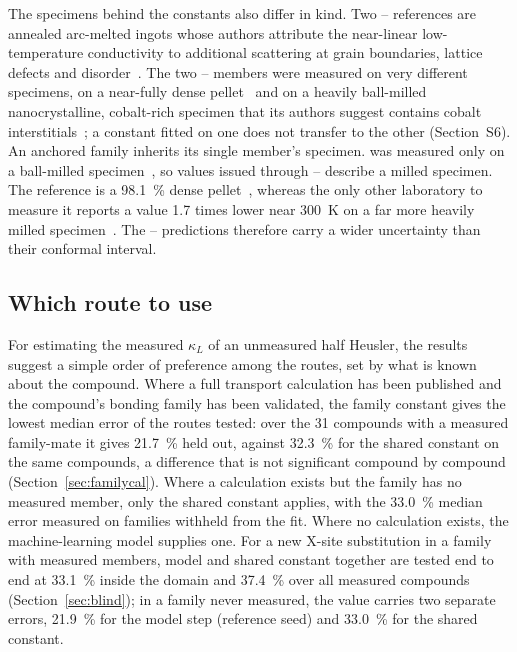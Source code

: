 The specimens behind the constants also differ in kind. Two -- references
are annealed arc-melted ingots whose authors attribute the near-linear low-temperature
conductivity to additional scattering at grain boundaries, lattice defects and
disorder~\cite{mukhopadhyay2018multifunct}. The two -- members were measured on very
different specimens,  on a near-fully dense pellet~\cite{thiem2025thermoelec} and
 on a heavily ball-milled nanocrystalline, cobalt-rich specimen that its authors
suggest contains cobalt interstitials~\cite{li2019ntype}; a constant fitted on one does not
transfer to the other (Section~S6). An anchored family inherits its single member's specimen.
 was measured only on a ball-milled specimen~\cite{mao2017thermoelec}, so values issued
through -- describe a milled specimen. The  reference is a
\SI{98.1}{\percent} dense pellet~\cite{zhao2018synthesis}, whereas the only other laboratory to
measure it reports a value \num{1.7} times lower near \SI{300}{\kelvin} on a far more heavily
milled specimen~\cite{zhu2018discovery}. The -- predictions therefore carry a wider
uncertainty than their conformal interval.

\subsection{Which route to use}
\label{sec:routes}

For estimating the measured $\kappa_L$ of an unmeasured half Heusler, the results suggest a simple
order of preference among the routes, set by what is known about the compound. Where a
full transport calculation has been published and the compound's bonding family has been
validated, the family constant gives the lowest median error of the routes tested: over the
\num{31} compounds with a measured family-mate it gives \SI{21.7}{\percent} held out, against
\SI{32.3}{\percent} for the shared constant on the same compounds, a difference that is not
significant compound by compound (Section~\ref{sec:familycal}). Where a calculation exists but
the family has no measured member, only the shared constant applies, with the \SI{33.0}{\percent}
median error measured on families withheld from the fit. Where no calculation exists, the
machine-learning model supplies one. For a new X-site substitution in a family with measured
members, model and shared constant together are tested end to end at \SI{33.1}{\percent} inside the
domain and \SI{37.4}{\percent} over all measured compounds (Section~\ref{sec:blind}); in a family never measured, the value carries two separate errors,
\SI{21.9}{\percent} for the model step (reference seed) and \SI{33.0}{\percent} for the shared
constant.


